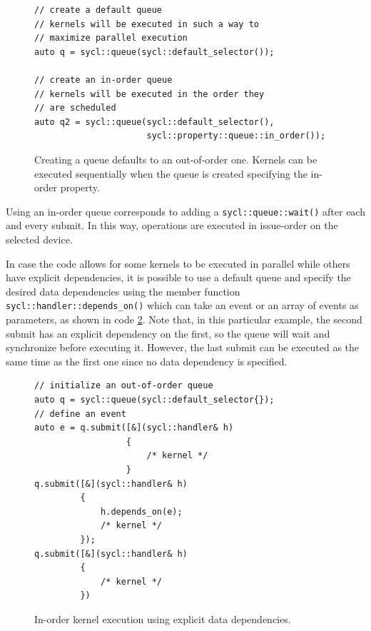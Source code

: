 \begin{figure}[ht!]
\renewcommand{\figurename}{Code}
\begin{verbatim}
// create a default queue
// kernels will be executed in such a way to 
// maximize parallel execution
auto q = sycl::queue(sycl::default_selector());

// create an in-order queue
// kernels will be executed in the order they
// are scheduled
auto q2 = sycl::queue(sycl::default_selector(),
                      sycl::property::queue::in_order());
\end{verbatim}
\caption{Creating a queue defaults to an out-of-order one. Kernels can be executed sequentially when the queue is created specifying the in-order property.}
\label{code:in_order_queue}
\end{figure}

Using an in-order queue corresponds to adding a \Verb "sycl::queue::wait()" after each and every submit. In this way, operations are executed in issue-order on the selected device.

In case the code allows for some kernels to be executed in parallel while others have explicit dependencies, it is possible to use a default queue and specify the desired data dependencies using the member function \Verb "sycl::handler::depends_on()" which can take an event or an array of events as parameters, as shown in code \ref{code:depens_on}. Note that, in this particular example, the second submit has an explicit dependency on the first, so the queue will wait and synchronize before executing it. However, the last submit can be executed as the same time as the first one since no data dependency is specified.

\begin{figure}[ht!]
\renewcommand{\figurename}{Code}
\begin{verbatim}
// initialize an out-of-order queue
auto q = sycl::queue(sycl::default_selector{});
// define an event
auto e = q.submit([&](sycl::handler& h)
                  {
                      /* kernel */
                  }
q.submit([&](sycl::handler& h)
         {
             h.depends_on(e);
             /* kernel */
         });
q.submit([&](sycl::handler& h)
         {
             /* kernel */
         })
\end{verbatim}
\caption{In-order kernel execution using explicit data dependencies.}
\label{code:depens_on}
\end{figure}